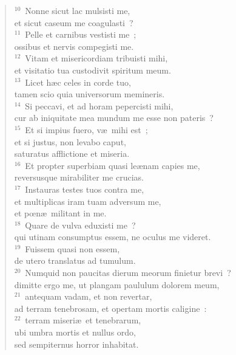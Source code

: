 \begin{flushleft}
\begin{verse}
${}^{10}$~Nonne sicut lac mulsisti me,\\ et sicut caseum me coagulasti~?\\
${}^{11}$~Pelle et carnibus vestisti me~;\\ ossibus et nervis compegisti me.\\
${}^{12}$~Vitam et misericordiam tribuisti mihi,\\ et visitatio tua custodivit spiritum meum.\\
${}^{13}$~Licet h\ae c celes in corde tuo,\\ tamen scio quia universorum memineris.\\
${}^{14}$~Si peccavi, et ad horam pepercisti mihi,\\ cur ab iniquitate mea mundum me esse non pateris~?\\
${}^{15}$~Et si impius fuero, v\ae\ mihi est~;\\ et si justus, non levabo caput,\\ saturatus afflictione et miseria.\\
${}^{16}$~Et propter superbiam quasi le\ae nam capies me,\\ reversusque mirabiliter me crucias.\\
${}^{17}$~Instauras testes tuos contra me,\\ et multiplicas iram tuam adversum me,\\ et pœn\ae\ militant in me.\\
${}^{18}$~Quare de vulva eduxisti me~?\\ qui utinam consumptus essem, ne oculus me videret.\\
${}^{19}$~Fuissem quasi non essem,\\ de utero translatus ad tumulum.\\
${}^{20}$~Numquid non paucitas dierum meorum finietur brevi~?\\ dimitte ergo me, ut plangam paululum dolorem meum,\\
${}^{21}$~antequam vadam, et non revertar,\\ ad terram tenebrosam, et opertam mortis caligine~:\\
${}^{22}$~terram miseri\ae\ et tenebrarum,\\ ubi umbra mortis et nullus ordo,\\ sed sempiternus horror inhabitat.\end{verse}\end{flushleft}



